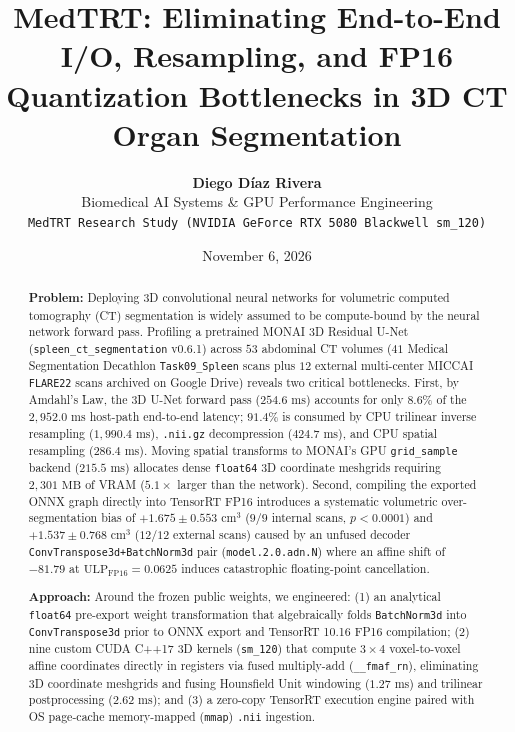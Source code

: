 \documentclass[10pt,twocolumn]{article}
\title{\textbf{MedTRT: Eliminating End-to-End I/O, Resampling, and FP16 Quantization Bottlenecks in 3D CT Organ Segmentation}}
\author{\textbf{Diego D\'iaz Rivera}\\
Biomedical AI Systems \& GPU Performance Engineering\\
\texttt{MedTRT Research Study (NVIDIA GeForce RTX 5080 Blackwell sm\_120)}}
\date{November 6, 2026}
\begin{document}
\maketitle

\begin{abstract}
\noindent\textbf{Problem:} Deploying 3D convolutional neural networks for volumetric computed tomography (CT) segmentation is widely assumed to be compute-bound by the neural network forward pass. Profiling a pretrained MONAI 3D Residual U-Net (\texttt{spleen\_ct\_segmentation} v0.6.1) across $53$ abdominal CT volumes ($41$ Medical Segmentation Decathlon \texttt{Task09\_Spleen} scans plus $12$ external multi-center MICCAI \texttt{FLARE22} scans archived on Google Drive) reveals two critical bottlenecks. First, by Amdahl's Law, the 3D U-Net forward pass ($254.6\text{ ms}$) accounts for only $8.6\%$ of the $2,952.0\text{ ms}$ host-path end-to-end latency; $91.4\%$ is consumed by CPU trilinear inverse resampling ($1,990.4\text{ ms}$), \texttt{.nii.gz} decompression ($424.7\text{ ms}$), and CPU spatial resampling ($286.4\text{ ms}$). Moving spatial transforms to MONAI's GPU \texttt{grid\_sample} backend ($215.5\text{ ms}$) allocates dense \texttt{float64} 3D coordinate meshgrids requiring $2,301\text{ MB}$ of VRAM ($5.1\times$ larger than the network). Second, compiling the exported ONNX graph directly into TensorRT FP16 introduces a systematic volumetric over-segmentation bias of $+1.675 \pm 0.553\text{ cm}^3$ ($9/9$ internal scans, $p < 0.0001$) and $+1.537 \pm 0.768\text{ cm}^3$ ($12/12$ external scans) caused by an unfused decoder \texttt{ConvTranspose3d+BatchNorm3d} pair (\texttt{model.2.0.adn.N}) where an affine shift of $-81.79$ at $\text{ULP}_{\text{FP16}} = 0.0625$ induces catastrophic floating-point cancellation.

\smallskip
\noindent\textbf{Approach:} Around the frozen public weights, we engineered: (1) an analytical \texttt{float64} pre-export weight transformation that algebraically folds \texttt{BatchNorm3d} into \texttt{ConvTranspose3d} prior to ONNX export and TensorRT 10.16 FP16 compilation; (2) nine custom CUDA C++17 3D kernels (\texttt{sm\_120}) that compute $3 \times 4$ voxel-to-voxel affine coordinates directly in registers via fused multiply-add (\texttt{\_\_fmaf\_rn}), eliminating 3D coordinate meshgrids and fusing Hounsfield Unit windowing ($1.27\text{ ms}$) and trilinear postprocessing ($2.62\text{ ms}$); and (3) a zero-copy TensorRT execution engine paired with OS page-cache memory-mapped (\texttt{mmap}) \texttt{.nii} ingestion.


\end{abstract}
\end{document}
